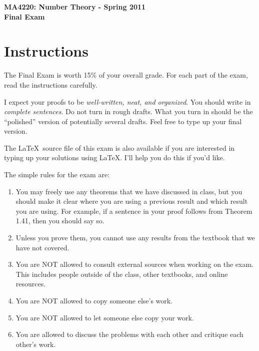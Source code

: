 \documentclass[11pt]{article}
\theoremstyle{definition}
\begin{document}
\begin{center}

{\Large\bf MA4220: Number Theory - Spring 2011}\\
\smallskip
{\Large\bf Final Exam}

\bigskip


\end{center}

\setlength{\fboxsep}{10pt}

\section*{Instructions}

The Final Exam is worth 15\% of your overall grade.  For each part of the exam, read the instructions carefully.

\bigskip

I expect your proofs to be \emph{well-written, neat, and organized}.  You should write in \emph{complete sentences}.  Do not turn in rough drafts.  What you turn in should be the ``polished'' version of potentially several drafts.  Feel free to type up your final version.  

\bigskip

The \LaTeX\ source file of this exam is also available if you are interested in typing up your solutions using \LaTeX.  I'll help you do this if you'd like.

\bigskip

The simple rules for the exam are:

\begin{enumerate}
\item You may freely use any theorems that we have discussed in class, but you should make it clear where you are using a previous result and which result you are using.  For example, if a sentence in your proof follows from Theorem 1.41, then you should say so.
\item Unless you prove them, you cannot use any results from the textbook that we have not covered.
\item You are NOT allowed to consult external sources when working on the exam.  This includes people outside of the class, other textbooks, and online resources.
\item You are NOT allowed to copy someone else's work.
\item You are NOT allowed to let someone else copy your work.
\item You are allowed to discuss the problems with each other and critique each other's work.
\end{enumerate}
\end{document}
